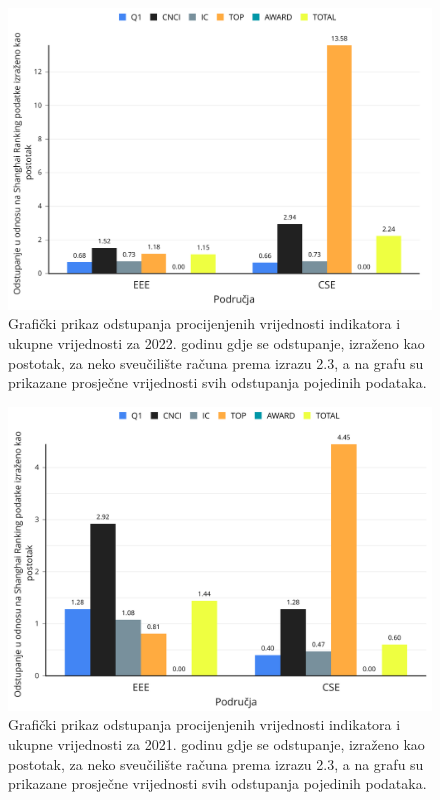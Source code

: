 \documentclass[times, utf8, zavrsni]{fer}
\begin{document}
\begin{figure}[htb]
    \centering
    \includegraphics[scale=0.25]{EEE2022.png}
    \caption{Grafički prikaz odstupanja procijenjenih vrijednosti indikatora i ukupne vrijednosti  za 2022. godinu gdje se odstupanje, izraženo kao postotak, za 
    neko sveučilište računa prema izrazu 2.3, a na grafu su prikazane prosječne vrijednosti svih odstupanja pojedinih podataka.}
    \label{fig:graf2022}
    \end{figure}
    \FloatBarrier

    \begin{figure}[htb]
        \centering
        \includegraphics[scale=0.25]{graf2021.png}
        \caption{Grafički prikaz odstupanja procijenjenih vrijednosti indikatora i ukupne vrijednosti  za 2021. godinu gdje se odstupanje, izraženo kao postotak, za 
        neko sveučilište računa prema izrazu 2.3, a na grafu su prikazane prosječne vrijednosti svih odstupanja pojedinih podataka.}
        \label{fig:graf2021}
        \end{figure}   
        \FloatBarrier 
\end{document}
